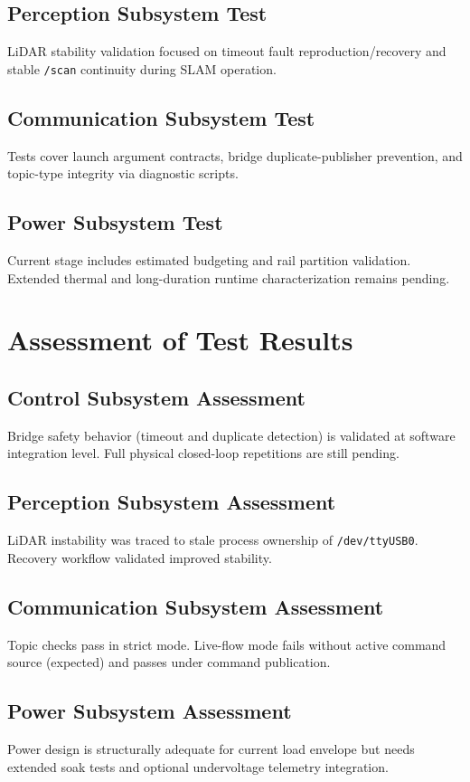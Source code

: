 \documentclass[12pt,a4paper]{report}
\begin{document}
\subsection{Perception Subsystem Test}
LiDAR stability validation focused on timeout fault reproduction/recovery and stable \texttt{/scan} continuity during SLAM operation.

\subsection{Communication Subsystem Test}
Tests cover launch argument contracts, bridge duplicate-publisher prevention, and topic-type integrity via diagnostic scripts.

\subsection{Power Subsystem Test}
Current stage includes estimated budgeting and rail partition validation. Extended thermal and long-duration runtime characterization remains pending.

\section{Assessment of Test Results}

\subsection{Control Subsystem Assessment}
Bridge safety behavior (timeout and duplicate detection) is validated at software integration level. Full physical closed-loop repetitions are still pending.

\subsection{Perception Subsystem Assessment}
LiDAR instability was traced to stale process ownership of \texttt{/dev/ttyUSB0}. Recovery workflow validated improved stability.

\subsection{Communication Subsystem Assessment}
Topic checks pass in strict mode. Live-flow mode fails without active command source (expected) and passes under command publication.

\subsection{Power Subsystem Assessment}
Power design is structurally adequate for current load envelope but needs extended soak tests and optional undervoltage telemetry integration.
\end{document}

